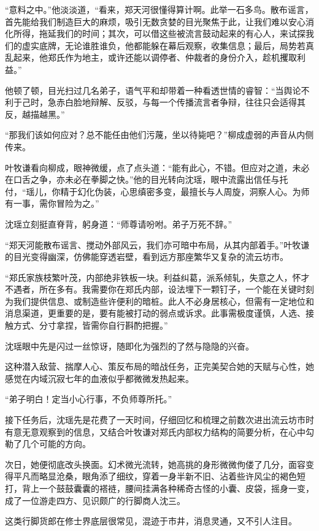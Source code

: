 “意料之中。”他淡淡道，“看来，郑天河很懂得算计啊。此举一石多鸟。散布谣言，首先能给我们制造巨大的麻烦，吸引无数贪婪的目光聚焦于此，让我们难以安心消化所得，拖延我们的时间；其次，可以借这些被流言鼓动起来的有心人，来试探我们的虚实底牌，无论谁胜谁负，他都能躲在幕后观察，收集信息；最后，局势若真乱起来，他郑氏作为地主，或许还能以调停者、仲裁者的身份介入，趁机攫取利益。”

他顿了顿，目光扫过几名弟子，语气平和却带着一种看透世情的睿智：“当舆论不利于己时，急赤白脸地辩解、反驳，与每一个传播流言者争辩，往往只会适得其反，越描越黑。”

“那我们该如何应对？总不能任由他们污蔑，坐以待毙吧？”柳成虚弱的声音从内侧传来。

叶牧谦看向柳成，眼神微缓，点了点头道：“能有此心，不错。但应对之道，未必在口舌之争，亦未必在拳脚之快。”他的目光转向沈瑶，眼中流露出信任与托付，“瑶儿，你精于幻化伪装，心思缜密多变，最擅长与人周旋，洞察人心。为师有一事，需你冒险为之。”

沈瑶立刻挺直脊背，躬身道：“师尊请吩咐。弟子万死不辞。”

“郑天河能散布谣言、搅动外部风云，我们亦可暗中布局，从其内部着手。”叶牧谦的目光变得幽深，仿佛能穿透岩壁，看到远方那座繁华又复杂的流云坊市。

“郑氏家族枝繁叶茂，内部绝非铁板一块。利益纠葛，派系倾轧，失意之人，怀才不遇者，所在多有。我需要你在郑氏内部，设法埋下一颗钉子，一个能在关键时刻为我们提供信息、或制造些许便利的暗桩。此人不必身居核心，但需有一定地位和消息渠道，更重要的是，要有能被打动的弱点或诉求。此事需极度谨慎，人选、接触方式、分寸拿捏，皆需你自行斟酌把握。”

沈瑶眼中先是闪过一丝惊讶，随即化为强烈的了然与隐隐的兴奋。

这种潜入敌营、揣摩人心、策反布局的暗战任务，正完美契合她的天赋与心性，她感觉在内域沉寂七年的血液似乎都微微发热起来。

“弟子明白！定当小心行事，不负师尊所托。”

\vspace{2em}

接下任务后，沈瑶先是花费了一天时间，仔细回忆和梳理之前数次进出流云坊市时有意无意观察到的信息，又结合叶牧谦对郑氏内部权力结构的简要分析，在心中勾勒了几个可能的方向。

次日，她便彻底改头换面。幻术微光流转，她高挑的身形微微佝偻了几分，面容变得平凡而略显沧桑，眼角添了细纹，穿着一身半新不旧、沾着些许风尘的褐色短打，背上一个鼓鼓囊囊的褡裢，腰间挂满各种稀奇古怪的小囊、皮袋，摇身一变，成了一位游走四方、见识颇广的行脚商人沈三。

这类行脚货郎在修士界底层很常见，混迹于市井，消息灵通，又不引人注目。

